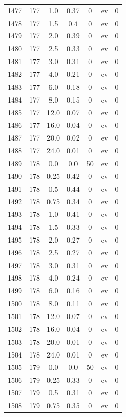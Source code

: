 \documentclass[12pt,a4paper]{article}
\begin{document}
\begin{tabular}{r|cccccc}
	1477 & 177 & 1.0 & 0.37 & 0 & ev & 0 \\
	1478 & 177 & 1.5 & 0.4 & 0 & ev & 0 \\
	1479 & 177 & 2.0 & 0.39 & 0 & ev & 0 \\
	1480 & 177 & 2.5 & 0.33 & 0 & ev & 0 \\
	1481 & 177 & 3.0 & 0.31 & 0 & ev & 0 \\
	1482 & 177 & 4.0 & 0.21 & 0 & ev & 0 \\
	1483 & 177 & 6.0 & 0.18 & 0 & ev & 0 \\
	1484 & 177 & 8.0 & 0.15 & 0 & ev & 0 \\
	1485 & 177 & 12.0 & 0.07 & 0 & ev & 0 \\
	1486 & 177 & 16.0 & 0.04 & 0 & ev & 0 \\
	1487 & 177 & 20.0 & 0.02 & 0 & ev & 0 \\
	1488 & 177 & 24.0 & 0.01 & 0 & ev & 0 \\
	1489 & 178 & 0.0 & 0.0 & 50 & ev & 0 \\
	1490 & 178 & 0.25 & 0.42 & 0 & ev & 0 \\
	1491 & 178 & 0.5 & 0.44 & 0 & ev & 0 \\
	1492 & 178 & 0.75 & 0.34 & 0 & ev & 0 \\
	1493 & 178 & 1.0 & 0.41 & 0 & ev & 0 \\
	1494 & 178 & 1.5 & 0.33 & 0 & ev & 0 \\
	1495 & 178 & 2.0 & 0.27 & 0 & ev & 0 \\
	1496 & 178 & 2.5 & 0.27 & 0 & ev & 0 \\
	1497 & 178 & 3.0 & 0.31 & 0 & ev & 0 \\
	1498 & 178 & 4.0 & 0.24 & 0 & ev & 0 \\
	1499 & 178 & 6.0 & 0.16 & 0 & ev & 0 \\
	1500 & 178 & 8.0 & 0.11 & 0 & ev & 0 \\
	1501 & 178 & 12.0 & 0.07 & 0 & ev & 0 \\
	1502 & 178 & 16.0 & 0.04 & 0 & ev & 0 \\
	1503 & 178 & 20.0 & 0.01 & 0 & ev & 0 \\
	1504 & 178 & 24.0 & 0.01 & 0 & ev & 0 \\
	1505 & 179 & 0.0 & 0.0 & 50 & ev & 0 \\
	1506 & 179 & 0.25 & 0.33 & 0 & ev & 0 \\
	1507 & 179 & 0.5 & 0.31 & 0 & ev & 0 \\
	1508 & 179 & 0.75 & 0.35 & 0 & ev & 0 \\

\end{tabular}
\end{document}
